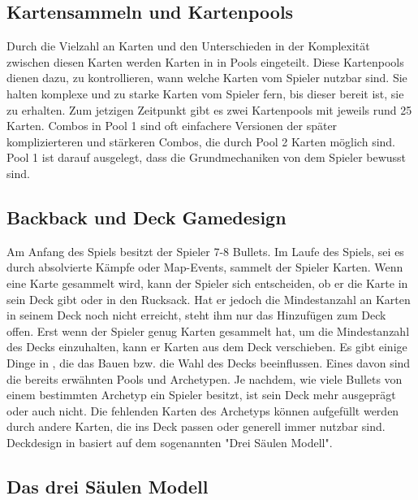 \subsection{Kartensammeln und Kartenpools}\label{subsec:placementMatters}

Durch die Vielzahl an Karten und den Unterschieden in der Komplexität zwischen diesen Karten werden Karten in \FF in Pools eingeteilt.
Diese Kartenpools dienen dazu, zu kontrollieren, wann welche Karten vom Spieler nutzbar sind.
Sie halten komplexe und zu starke Karten vom Spieler fern, bis dieser bereit ist, sie zu erhalten.
Zum jetzigen Zeitpunkt gibt es zwei Kartenpools mit jeweils rund 25 Karten. Combos in Pool 1 sind oft einfachere
Versionen der später komplizierteren und stärkeren Combos, die durch Pool 2 Karten möglich sind.
Pool 1 ist darauf ausgelegt, dass die Grundmechaniken von \FF dem Spieler bewusst sind.


\subsection{Backback und Deck Gamedesign}\label{subsec:placementMatters}

Am Anfang des Spiels besitzt der Spieler 7-8 Bullets. Im Laufe des Spiels, sei es durch absolvierte Kämpfe
oder Map-Events, sammelt der Spieler Karten. Wenn eine Karte gesammelt wird, kann der Spieler sich entscheiden,
ob er die Karte in sein Deck gibt oder in den Rucksack. Hat er jedoch die Mindestanzahl an Karten in seinem Deck
noch nicht erreicht, steht ihm nur das Hinzufügen zum Deck offen. Erst wenn der Spieler genug Karten gesammelt hat,
um die Mindestanzahl des Decks einzuhalten, kann er Karten aus dem Deck verschieben. Es gibt einige Dinge
in \FF, die das Bauen bzw. die Wahl des Decks beeinflussen. Eines davon sind die bereits erwähnten Pools und Archetypen.
Je nachdem, wie viele Bullets von einem bestimmten Archetyp ein Spieler besitzt, ist sein Deck mehr ausgeprägt oder auch nicht.
Die fehlenden Karten des Archetyps können aufgefüllt werden durch andere Karten, die ins Deck passen oder generell immer nutzbar sind.
Deckdesign in \FF basiert auf dem sogenannten "Drei Säulen Modell".


\subsection{Das drei Säulen Modell}\label{subsec:placementMatters}


